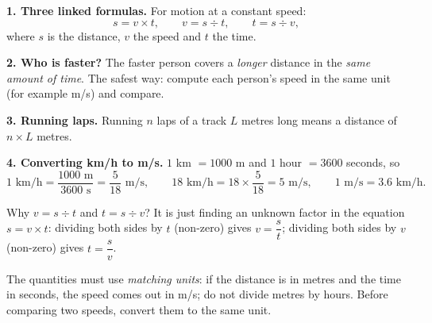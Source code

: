 \begin{knowbox}
\textbf{1. Three linked formulas.} For motion at a constant speed:
\[ s = v \times t, \qquad v = s \div t, \qquad t = s \div v, \]
where $s$ is the distance, $v$ the speed and $t$ the time.

\textbf{2. Who is faster?} The faster person covers a \emph{longer} distance in the \emph{same amount of time}. The
safest way: compute each person's speed in the same unit (for example m/s) and compare.

\textbf{3. Running laps.} Running $n$ laps of a track $L$ metres long means a distance of $n \times L$ metres.

\textbf{4. Converting km/h to m/s.} $1$ km $= 1000$ m and $1$ hour $= 3600$ seconds, so
\[ 1 \text{ km/h} = \frac{1000 \text{ m}}{3600 \text{ s}} = \frac{5}{18} \text{ m/s}, \qquad
   18 \text{ km/h} = 18\times\frac{5}{18} = 5 \text{ m/s}, \qquad 1 \text{ m/s} = 3.6 \text{ km/h}. \]
\end{knowbox}
\begin{proofbox}
Why $v = s \div t$ and $t = s \div v$? It is just finding an unknown factor in the equation $s = v\times t$: dividing
both sides by $t$ (non-zero) gives $v = \dfrac{s}{t}$; dividing both sides by $v$ (non-zero) gives $t = \dfrac{s}{v}$.
\end{proofbox}
\begin{warnbox}
The quantities must use \emph{matching units}: if the distance is in metres and the time in seconds, the speed comes
out in m/s; do not divide metres by hours. Before comparing two speeds, convert them to the same unit.
\end{warnbox}

